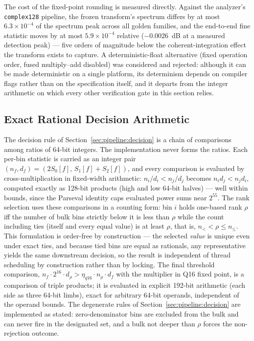 The cost of the fixed-point rounding is measured directly. Against the analyzer's \texttt{complex128} pipeline, the frozen transform's spectrum differs by at most $6.3 \times 10^{-4}$ of the spectrum peak across all golden families, and the end-to-end fine statistic moves by at most $5.9 \times 10^{-4}$ relative ($-0.0026$~dB at a measured detection peak) --- five orders of magnitude below the coherent-integration effect the transform exists to capture. A deterministic-float alternative (fixed operation order, fused multiply--add disabled) was considered and rejected: although it can be made deterministic on a single platform, its determinism depends on compiler flags rather than on the specification itself, and it departs from the integer arithmetic on which every other verification gate in this section relies.

\subsection{Exact Rational Decision Arithmetic}
\label{sec:impl:decision}
The decision rule of Section~\ref{sec:pipeline:decision} is a chain of comparisons among ratios of 64-bit integers. The implementation never forms the ratios. Each per-bin statistic is carried as an integer pair $(n_f, d_f) = (2 S_0[f],\, S_1[f] + S_2[f])$, and every comparison is evaluated by cross-multiplication in fixed-width arithmetic: $n_i / d_i < n_j / d_j$ becomes $n_i d_j < n_j d_i$, computed exactly as 128-bit products (high and low 64-bit halves) --- well within bounds, since the Parseval identity caps evaluated power sums near $2^{55}$. The rank selection uses these comparisons in a counting form: bin $i$ holds one-based rank $\rho$ iff the number of bulk bins strictly below it is less than $\rho$ while the count including ties (itself and every equal value) is at least $\rho$, that is, $n_{<} < \rho \le n_{\le}$. This formulation is order-free by construction --- the selected \emph{value} is unique even under exact ties, and because tied bins are equal as rationals, any representative yields the same downstream decision, so the result is independent of thread scheduling by construction rather than by locking. The final threshold comparison, $n_f \cdot 2^{16} \cdot d_\rho > \eta_{q16} \cdot n_\rho \cdot d_f$ with the multiplier in Q16 fixed point, is a comparison of triple products; it is evaluated in explicit 192-bit arithmetic (each side as three 64-bit limbs), exact for arbitrary 64-bit operands, independent of the operand bounds. The degenerate rules of Section~\ref{sec:pipeline:decision} are implemented as stated: zero-denominator bins are excluded from the bulk and can never fire in the designated set, and a bulk not deeper than $\rho$ forces the non-rejection outcome.


